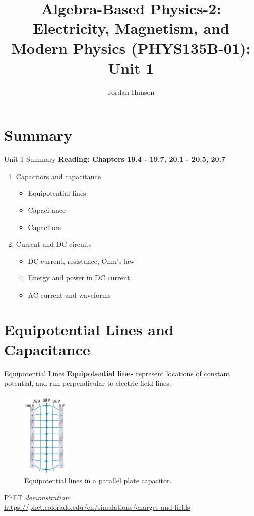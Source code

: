 \documentclass{beamer}
\title{Algebra-Based Physics-2: Electricity, Magnetism, and Modern Physics (PHYS135B-01): Unit 1}
\author{Jordan Hanson}
\institute{Whittier College Department of Physics and Astronomy}
\begin{document}
\maketitle

\section{Summary}

\begin{frame}{Unit 1 Summary}
\textbf{Reading: Chapters 19.4 - 19.7, 20.1 - 20.5, 20.7}
\begin{enumerate}
\item Capacitors and capacitance
\begin{itemize}
\item Equipotential lines
\item Capacitance
\item Capacitors
\end{itemize}
\item Current and DC circuits
\begin{itemize}
\item DC current, resistance, Ohm's law
\item Energy and power in DC current
\item AC current and waveforms
\end{itemize}
\end{enumerate}
\end{frame}

\section{Equipotential Lines and Capacitance}

\begin{frame}{Equipotential Lines}
\small
\textbf{\alert{Equipotential lines}} represent locations of constant potential, and run perpendicular to electric field lines.
\begin{figure}
\centering
\includegraphics[width=0.2\textwidth]{figures/plates.png}
\caption{\label{fig:plates} Equipotential lines in a parallel plate capacitor.}
\end{figure}
PhET \textit{demonstration}: \\ \url{https://phet.colorado.edu/en/simulations/charges-and-fields}
\end{frame}
\end{document}
